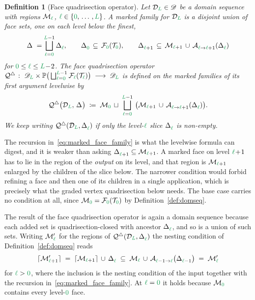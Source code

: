 \documentclass[a4paper, 12pt]{article}
\makeatletter
\newcommand{\quadriF}{\mathcal{Q}^{\triangle}}                   %
\newcommand{\green}{\color{ForestGreen}}
\newcommand{\T}{\mathcal{T}}
\newcommand{\F}{\mathcal{F}}
\DeclareRobustCommand{\simplexsubsetTwo}[2][]{\Delta\ifx\@empty#1\@empty\else^{#1}\fi_{#2}}
\renewcommand{\l}{{\green\ell}}
\renewcommand{\L}{{\green L}}
\newcommand{\lzero}{{\green 0}}
\newcommand{\Aop}[3]{\mathcal{A}^{#1}_{{#2} \to {#3}}}
\renewcommand{\powerset}{\mathbb{P}}
\newcommand{\M}{\mathcal{M}}
\newtheorem{definition}[theorem]{Definition}
\theoremstyle{definition}
\theoremstyle{plain}
\numberwithin{equation}{section}
\newcommand{\ancestorPatch}[1]{\lceil #1 \rceil}
\DeclareRobustCommand{\domseq}[1][]{\mathcal{D}\ifx\@empty#1\@empty\else_{#1}\fi}
\newcommand{\alldomseqs}{\mathscr{D}}
\makeatother
\begin{document}
\begin{definition}[Face quadrisection operator]
    \label{def:face_quadrisection_operator}
    Let $\domseq[\L] \in \alldomseqs$ be a domain sequence with regions $\M_\l$, $\l \in \{ \lzero, \, \dots \,, \L\}$. A \emph{marked family} for $\domseq[\L]$ is a disjoint union of face sets, one on each level below the finest,
    \begin{equation}
        \label{eq:marked_face_family}
        \simplexsubsetTwo{} \; = \bigsqcup\limits_{\l = \lzero}^{\L-1} \simplexsubsetTwo{\l}, \qquad \simplexsubsetTwo{\lzero} \, \subseteq \, \F_\lzero(\T_\lzero), \qquad \simplexsubsetTwo{\l+1} \, \subseteq \, \M_{\l+1} \, \cup \, \Aop{}{\l}{\l+1} ( \simplexsubsetTwo{\l} )
    \end{equation}
    for $\lzero \leq \l \leq \L \! - \! 2$. The \emph{face quadrisection operator} $\quadriF \; \colon \; \alldomseqs_\L \times \powerset \big( \bigsqcup_{\l = \lzero}^{\L-1} \F_\l(\T_\l) \big) \; \longrightarrow \; \alldomseqs_\L$ is defined on the marked families of its first argument levelwise by
    \begin{equation}
        \label{eq:def_face_quadrisection_operator}
        \quadriF \big( \domseq[\L], \, \simplexsubsetTwo{} \big) \; \coloneq \; \M_\lzero \, \sqcup \; \bigsqcup\limits_{\l = \lzero}^{\L-1} \, \big( \M_{\l+1} \, \cup \, \Aop{}{\l}{\l+1}(\simplexsubsetTwo{\l}) \big).
    \end{equation}
    We keep writing $\quadriF ( \domseq[\L], \simplexsubsetTwo{\l} )$ if only the level-$\l$ slice $\simplexsubsetTwo{\l}$ is non-empty.
\end{definition}

The recursion in~\eqref{eq:marked_face_family} is what the levelwise formula can digest, and it is weaker than asking $\simplexsubsetTwo{\l+1} \subseteq \M_{\l+1}$. A marked face on level $\l\!+\!1$ has to lie in the region of the \emph{output} on its level, and that region is $\M_{\l+1}$ enlarged by the children of the slice below. The narrower condition would forbid refining a face and then one of its children in a single application, which is precisely what the graded vertex quadrisection below needs. The base case carries no condition at all, since $\M_\lzero = \F_\lzero(\T_\lzero)$ by Definition~\ref{def:domseq}.

The result of the face quadrisection operator is again a domain sequence because each added set is quadrisection-closed with ancestor $\simplexsubsetTwo{\l}$, and so is a union of such sets. Writing $\M'_\l$ for the regions of $\quadriF ( \domseq[\L], \simplexsubsetTwo{\l} )$ the nesting condition of Definition~\ref{def:domseq} reads
\begin{equation}
    \label{eq:face_quadrisection_nesting}
    \ancestorPatch{\M'_{\l+1}} \; = \; \ancestorPatch{\M_{\l+1}} \, \cup \, \simplexsubsetTwo{\l} \; \subseteq \; \M_\l \, \cup \, \Aop{}{\l-1}{\l} \big( \simplexsubsetTwo{\l-1} \big) \; = \; \M'_\l
\end{equation}
for $\l > \lzero$, where the inclusion is the nesting condition of the input together with the recursion in~\eqref{eq:marked_face_family}. At $\l = \lzero$ it holds because $\M_\lzero$ contains every level-$\lzero$ face.
\end{document}
